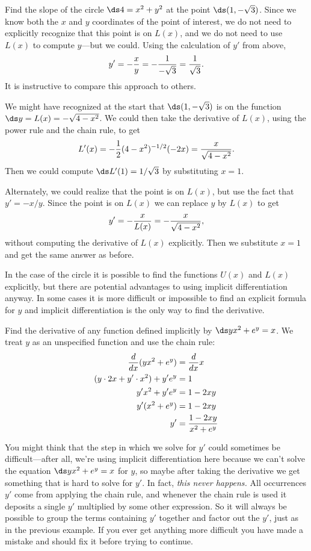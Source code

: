 \begin{example}
Find the slope of the circle $\ds 4=x^2+y^2$ at the point
$\ds (1,-\sqrt{3})$. Since we know both the $x$ and $y$ coordinates of the
point of interest, we do not need to explicitly recognize that this
point is on $L(x)$, and we do not need to use $L(x)$ to compute
$y$---but we could. Using the calculation of $y'$ from above, 
$$y'=-{x\over y}=-{1\over -\sqrt{3}}={1\over \sqrt{3}}.$$
It is instructive to compare this approach to others.

We might have recognized at the start that $\ds (1,-\sqrt{3})$ is on the
function $\ds y=L(x)=-\sqrt{4-x^2}$. We could then take the derivative of
$L(x)$, using the power rule and the chain rule, to get
$$L'(x)=-{1\over 2}(4-x^2)^{-1/2}(-2x)={x\over\sqrt{4-x^2}}.$$
Then we could compute $\ds L'(1)=1/\sqrt{3}$ by substituting $x=1$.

Alternately, we could realize that the point is on $L(x)$, but use the
fact that $y'=-x/y$. Since the point is on $L(x)$ we can replace $y$
by $L(x)$ to get
$$y'=-{x\over L(x)}=-{x\over \sqrt{4-x^2}},$$
without computing the derivative of $L(x)$ explicitly. Then we
substitute $x=1$ and get the same answer as before.
\end{example}

In the case of the circle it is possible to find the functions $U(x)$
and $L(x)$ explicitly, but there are potential advantages to using
implicit differentiation anyway. In some cases it is more difficult or
impossible to find an explicit formula for $y$ and implicit
differentiation is the only way to find the derivative.

\begin{example}
Find the derivative of any function defined implicitly by 
$\ds yx^2+e^y=x$. We treat $y$ as an unspecified function and use the
chain rule:
\begin{align*}
{d\over dx}(yx^2+e^y)&={d\over dx}x \\
(y\cdot 2x+y'\cdot x^2)+y'e^y &= 1 \\
y'x^2+y'e^y&= 1-2xy \\
y'(x^2+e^y)&= 1-2xy \\
y'&={1-2xy\over x^2+e^y} \\
\end{align*}
\vskip-18pt\end{example}

You might think that the step in which we solve for $y'$ could
sometimes be difficult---after all, we're using implicit
differentiation here because we can't solve the equation
$\ds yx^2+e^y=x$ for $y$, so maybe after taking the derivative we get
something that is hard to solve for $y'$. In fact, {\it this never
  happens.} All occurrences $y'$ come from applying the chain rule,
and whenever the chain rule is used it deposits a single $y'$
multiplied by some other expression. So it will always be possible to
group the terms containing $y'$ together and factor out the $y'$, just
as in the previous example. If you ever get anything more difficult
you have made a mistake and should fix it before trying to continue.


